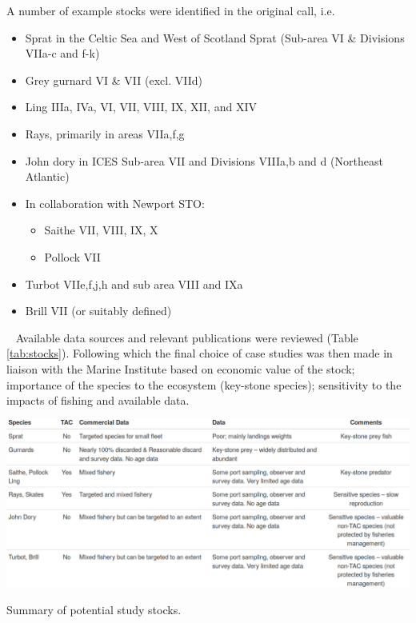 A number of example stocks were identified in the original call, i.e.  

\begin{itemize}[labelindent=\parindent,noitemsep,topsep=0pt,parsep=0pt,partopsep=0pt]
 \item Sprat in the Celtic Sea and West of Scotland Sprat (Sub-area VI \& Divisions VIIa-c and f-k)
 \item Grey gurnard VI \& VII (excl. VIId)
 \item Ling IIIa, IVa, VI, VII, VIII, IX, XII, and XIV 
 \item Rays, primarily in areas VIIa,f,g 
 \item John dory in ICES Sub-area VII and Divisions VIIIa,b and d (Northeast Atlantic)
 \item In collaboration with Newport STO:
\begin{itemize} 
 \item Saithe VII, VIII, IX, X
 \item Pollock VII
\end{itemize}
\item Turbot VIIe,f,j,h and sub area VIII and IXa
\item Brill VII (or suitably defined)
\end{itemize}

~\newline
Available data sources and relevant publications were reviewed (Table \ref{tab:stocks}). Following which the final choice of case studies was then made in liaison with the Marine Institute based on economic value of the stock; importance of the species to the ecosystem (key-stone species); sensitivity to the impacts of fishing and available data.  

\begin{table}[h!]\centering\includegraphics[width=6in]{tabs/stocks.png}\caption{Summary of potential study stocks.}\label{tab:stocks}
\end{table}
 
